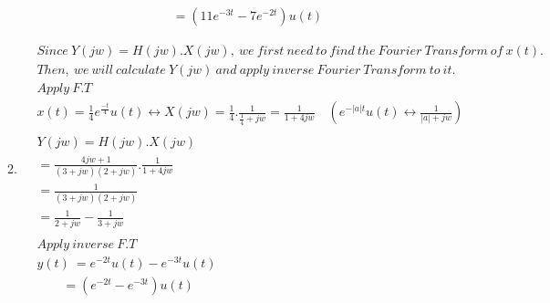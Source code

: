 \documentclass[10pt,a4paper, margin=1in]{article}
\begin{document}
\begin{enumerate}
\begin{enumerate}
\begin{align*}
    &\quad \quad =(11e^{-3t} - 7e^{-2t})u(t)
    \end{align*}
    \item %
    \begin{align*}
    &Since \ Y(jw) = H(jw).X(jw), \ we \ first \ need \ to \ find \ the \ Fourier \ Transform \ of \ x(t). \\ 
    &Then, \ we \ will \ calculate \ Y(jw) \ and \ apply \ inverse \ Fourier \ Transform \ to \ it. \\
    &Apply \ F.T \\ 
    &x(t)= \frac{1}{4}e^{\frac{-t}{4}}u(t) \longleftrightarrow X(jw) = \frac{1}{4}.\frac{1}{\frac{1}{4}+jw} = \frac{1}{1+4jw}  \quad (e^{-|a|t}u(t) \longleftrightarrow \frac{1}{|a| + jw})\\ \\
    &Y(jw) = H(jw).X(jw) \\
    &= \frac{4jw+1}{(3+jw)(2+jw)} . \frac{1}{1+4jw} \\
    &= \frac{1}{(3+jw)(2+jw)} \\
    &= \frac{1}{2+jw} - \frac{1}{3+jw} \\ \\
    &Apply \ inverse \ F.T \\
    &y(t) \ = e^{-2t}u(t) - e^{-3t}u(t) \\
    &\quad \quad = (e^{-2t} - e^{-3t})u(t)
    \end{align*}
    \end{enumerate}


\end{enumerate}
\end{document}

